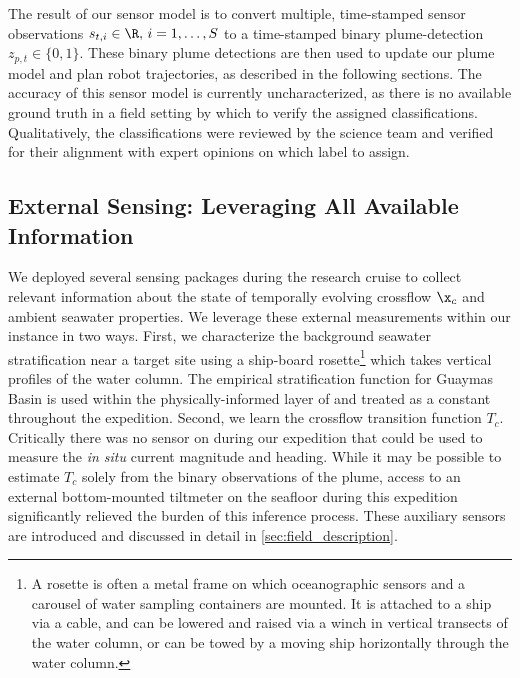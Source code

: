 The result of our sensor model is to convert multiple, time-stamped sensor observations $s_{t, i} \in \R, \, i = 1, \dots, S$ to a time-stamped binary plume-detection $z_{p, t} \in \{0, 1\}$. These binary plume detections are then used to update our plume model and plan robot trajectories, as described in the following sections. The accuracy of this sensor model is currently uncharacterized, as there is no available ground truth in a field setting by which to verify the assigned classifications. Qualitatively, the classifications were reviewed by the science team and verified for their alignment with expert opinions on which label to assign.


\subsection{External Sensing: Leveraging All Available Information}
\label{sec:external_current}
We deployed several sensing packages during the research cruise to collect relevant information about the state of temporally evolving crossflow $\x_c$ and ambient seawater properties. We leverage these external measurements within our \PHUMES instance in two ways. First, we characterize the background seawater stratification near a target site using a ship-board rosette\footnote{A rosette is often a metal frame on which oceanographic sensors and a carousel of water sampling containers are mounted. It is attached to a ship via a cable, and can be lowered and raised via a winch in vertical transects of the water column, or can be towed by a moving ship horizontally through the water column.} which takes vertical profiles of the water column. The empirical stratification function for Guaymas Basin is used within the physically-informed layer of \PHUMES and treated as a constant throughout the expedition. Second, we learn the crossflow transition function $T_c$. Critically there was no sensor on \Sentry during our expedition that could be used to measure the \emph{in situ} current magnitude and heading. While it may be possible to estimate $T_c$ solely from the binary observations of the plume, access to an external bottom-mounted tiltmeter on the seafloor during this expedition significantly relieved the burden of this inference process. These auxiliary sensors are introduced and discussed in detail in \cref{sec:field_description}. 

